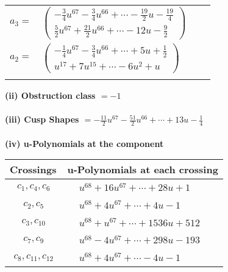 \documentclass[1p]{elsarticle_modified}
\theoremstyle{definition}
\begin{document}
\begin{tabular}{m{7pt} m{180pt} m{7pt} m{180pt} }
\flushright $a_{3}=$&$\begin{pmatrix}-\frac{3}{4} u^{67}-\frac{3}{4} u^{66}+\cdots-\frac{19}{2} u-\frac{19}{4}\\\frac{5}{2} u^{67}+\frac{21}{2} u^{66}+\cdots-12 u-\frac{9}{2}\end{pmatrix}$ \\
\flushright $a_{2}=$&$\begin{pmatrix}-\frac{1}{4} u^{67}-\frac{3}{4} u^{66}+\cdots+5 u+\frac{1}{2}\\u^{17}+7 u^{15}+\cdots-6 u^2+u\end{pmatrix}$\\&\end{tabular}
\flushleft \textbf{(ii) Obstruction class $= -1$}\\~\\
\flushleft \textbf{(iii) Cusp Shapes $= -\frac{11}{2} u^{67}-\frac{51}{2} u^{66}+\cdots+13 u-\frac{1}{4}$}\\~\\
\newpage\renewcommand{\arraystretch}{1}
\flushleft \textbf{(iv) u-Polynomials at the component}\newline \\
\begin{tabular}{m{50pt}|m{274pt}}
Crossings & \hspace{64pt}u-Polynomials at each crossing \\
\hline $$\begin{aligned}c_{1},c_{4},c_{6}\end{aligned}$$&$\begin{aligned}
&u^{68}+16 u^{67}+\cdots+28 u+1
\end{aligned}$\\
\hline $$\begin{aligned}c_{2},c_{5}\end{aligned}$$&$\begin{aligned}
&u^{68}+4 u^{67}+\cdots+4 u-1
\end{aligned}$\\
\hline $$\begin{aligned}c_{3},c_{10}\end{aligned}$$&$\begin{aligned}
&u^{68}+u^{67}+\cdots+1536 u+512
\end{aligned}$\\
\hline $$\begin{aligned}c_{7},c_{9}\end{aligned}$$&$\begin{aligned}
&u^{68}-4 u^{67}+\cdots+298 u-193
\end{aligned}$\\
\hline $$\begin{aligned}c_{8},c_{11},c_{12}\end{aligned}$$&$\begin{aligned}
&u^{68}+4 u^{67}+\cdots-4 u-1
\end{aligned}$\\
\hline
\end{tabular}\\~\\
\end{document}
